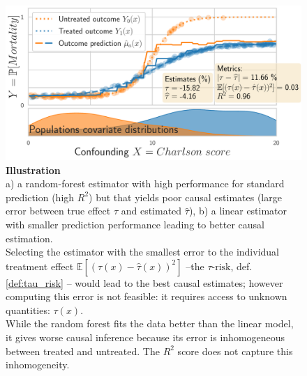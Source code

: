 \documentclass{report}
\begin{document}
\begin{figure}[t!]
  \begin{minipage}{0.32\textwidth}
    \caption[The best predictor may not estimate best causal
      effects]{\textbf{Illustration} \\a) a random-forest estimator
      with high performance for standard prediction (high $R^2$) but that
      yields poor causal estimates (large error between true effect $\tau$ and
      estimated $\hat{\tau}$), b) a linear estimator with smaller
      prediction performance leading to better causal estimation. \\[1ex]
      Selecting the estimator with the smallest error to the individual
      treatment effect $\mathbb{E}[(\tau(x) - \hat{\tau}(x))^2]$
      --the $\tau\text{-risk}$, def.\,\ref{def:tau_risk} -- would lead to
      the best causal estimates; however computing this error is not
      feasible: it requires access to unknown quantities:
      $\tau(x)$. \\[1ex]
      While the random forest fits the data better than the linear model, it
      gives worse causal inference because its error is inhomogeneous between
      treated and untreated. The $R^2$ score does not capture this
      inhomogeneity.
      \label{fig:toy_example}
    }
  \end{minipage}
  \hfill
  \begin{minipage}{0.65\textwidth}
    {\sffamily\footnotesize{}}

    \includegraphics[width=1\linewidth]{img/chapter_5/toy_random_forest_high_R2_high_tau_risk.pdf}%

    {\sffamily\footnotesize{}}


\end{minipage}
\end{figure}
\end{document}

